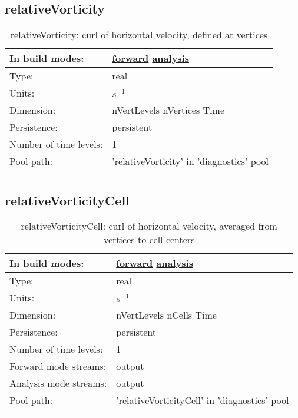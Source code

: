 \subsection[relativeVorticity]{relativeVorticity}
\label{subsec:var_sec_diagnostics_relativeVorticity}
\begin{center}
\begin{longtable}{| p{2.0in} | p{4.0in} |}
        \hline 
        In build modes: & \hyperref[subsec:forward_var_tab_diagnostics]{forward} \hyperref[subsec:analysis_var_tab_diagnostics]{analysis} \\
        \hline 
        Type: & real \\
        \hline 
        Units: & $s^{-1}$ \\
        \hline 
        Dimension: & nVertLevels nVertices Time \\
        \hline 
        Persistence: & persistent \\
        \hline 
        Number of time levels: & 1 \\
        \hline 
            Pool path: & 'relativeVorticity' in 'diagnostics' pool
 \\
		 \hline 
    \caption{relativeVorticity: curl of horizontal velocity, defined at vertices}
\end{longtable}
\end{center}
\subsection[relativeVorticityCell]{relativeVorticityCell}
\label{subsec:var_sec_diagnostics_relativeVorticityCell}
\begin{center}
\begin{longtable}{| p{2.0in} | p{4.0in} |}
        \hline 
        In build modes: & \hyperref[subsec:forward_var_tab_diagnostics]{forward} \hyperref[subsec:analysis_var_tab_diagnostics]{analysis} \\
        \hline 
        Type: & real \\
        \hline 
        Units: & $s^{-1}$ \\
        \hline 
        Dimension: & nVertLevels nCells Time \\
        \hline 
        Persistence: & persistent \\
        \hline 
        Number of time levels: & 1 \\
        \hline 
		 Forward mode streams: &  output \\
        \hline 
		 Analysis mode streams: &  output \\
        \hline 
            Pool path: & 'relativeVorticityCell' in 'diagnostics' pool
 \\
		 \hline 
    \caption{relativeVorticityCell: curl of horizontal velocity, averaged from vertices to cell centers}
\end{longtable}
\end{center}
